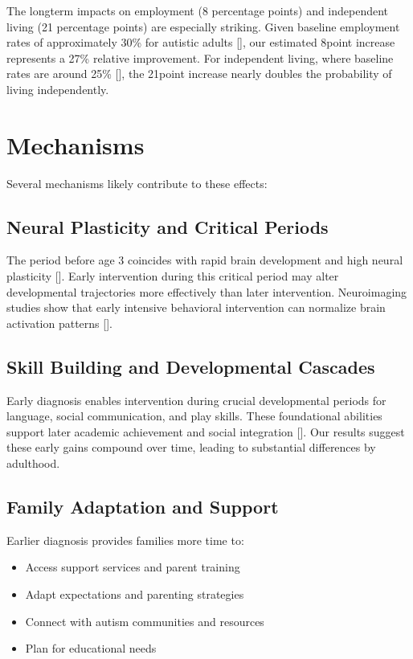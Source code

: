 \documentclass[letterpaper,10pt,english]{jupyterBook}
\begin{document}
\sphinxAtStartPar
The long\sphinxhyphen{}term impacts on employment (8 percentage points) and independent living (21 percentage points) are especially striking. Given baseline employment rates of approximately 30\% for autistic adults {[}{]}, our estimated 8\sphinxhyphen{}point increase represents a 27\% relative improvement. For independent living, where baseline rates are around 25\% {[}{]}, the 21\sphinxhyphen{}point increase nearly doubles the probability of living independently.


\section{Mechanisms}
\label{\detokenize{discussion:mechanisms}}
\sphinxAtStartPar
Several mechanisms likely contribute to these effects:


\subsection{Neural Plasticity and Critical Periods}
\label{\detokenize{discussion:neural-plasticity-and-critical-periods}}
\sphinxAtStartPar
The period before age 3 coincides with rapid brain development and high neural plasticity {[}{]}. Early intervention during this critical period may alter developmental trajectories more effectively than later intervention. Neuroimaging studies show that early intensive behavioral intervention can normalize brain activation patterns {[}{]}.


\subsection{Skill Building and Developmental Cascades}
\label{\detokenize{discussion:skill-building-and-developmental-cascades}}
\sphinxAtStartPar
Early diagnosis enables intervention during crucial developmental periods for language, social communication, and play skills. These foundational abilities support later academic achievement and social integration {[}{]}. Our results suggest these early gains compound over time, leading to substantial differences by adulthood.


\subsection{Family Adaptation and Support}
\label{\detokenize{discussion:family-adaptation-and-support}}
\sphinxAtStartPar
Earlier diagnosis provides families more time to:
\begin{itemize}
\item {} 
\sphinxAtStartPar
Access support services and parent training

\item {} 
\sphinxAtStartPar
Adapt expectations and parenting strategies

\item {} 
\sphinxAtStartPar
Connect with autism communities and resources

\item {} 
\sphinxAtStartPar
Plan for educational needs

\end{itemize}
\end{document}
